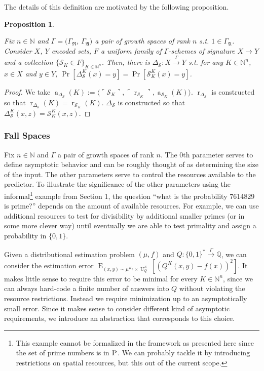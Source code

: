 \documentclass{article}
\numberwithin{equation}{section}
\theoremstyle{definition}
\theoremstyle{plain}
\newtheorem{proposition}{Proposition}[section]
\newcommand{\Bool}{\{0,1\}}
\newcommand{\Words}{{\Bool^*}}
\DeclareMathOperator{\E}{E}
\DeclareMathOperator{\R}{r}
\DeclareMathOperator{\A}{a}
\DeclareMathOperator{\Un}{U}
\newcommand{\Nats}{\mathbb{N}}
\newcommand{\Rats}{\mathbb{Q}}
\newcommand{\Chev}[1]{\langle #1 \rangle}
\newcommand{\Quote}[1]{\ulcorner #1 \urcorner}
\newcommand{\GrowR}{\Gamma_{\mathfrak{R}}}
\newcommand{\GrowA}{\Gamma_{\mathfrak{A}}}
\newcommand{\Scheme}{\xrightarrow{\Gamma}}
\begin{document}
The details of this definition are motivated by the following proposition.

\begin{proposition}
\label{prp:fam_diag}

Fix $n \in \Nats$ and $\Gamma=(\GrowR$, $\GrowA)$ a pair of growth spaces of rank $n$ s.t. $1 \in \GrowA$. Consider $X$, $Y$ encoded sets, $F$ a uniform family of $\Gamma$-schemes of signature $X \rightarrow Y$ and a collection ${\{\mathcal{S}_K \in F\}_{K \in \Nats^n}}$. Then, there is $\Delta_\mathcal{S}: X \xrightarrow{
\Gamma} Y$ s.t. for any $K \in \Nats^n$, $x \in X$ and $y \in Y$, ${\Pr[\Delta_\mathcal{S}^K(x)=y] = \Pr[\mathcal{S}_K^K(x)=y]}$.

\end{proposition}

\begin{proof}

We take $\A_{\Delta_{\mathcal{S}}}(K):=\Chev{\Quote{\mathcal{S}_K},\Quote{\R_{\mathcal{S}_K}},\A_{\mathcal{S}_K}(K)}$. $\R_{\Delta_{\mathcal{S}}}$ is constructed so that ${\R_{\Delta_{\mathcal{S}}}(K)=\R_{\mathcal{S}_K}(K)}$. $\Delta_{\mathcal{S}}$ is constructed so that $\Delta_{\mathcal{S}}^K(x,z)=\mathcal{S}_K^K(x,z)$.
\end{proof}

\subsubsection{Fall Spaces}

Fix $n \in \Nats$ and $\Gamma$ a pair of growth spaces of rank $n$. The 0th parameter serves to define asymptotic behavior and can be roughly thought of as determining the size of the input. The other parameters serve to control the resources available to the predictor. To illustrate the significance of the other parameters using the informal\footnote{This example cannot be formalized in the framework as presented here since the set of prime numbers is in $\textsc{P}$. We can probably tackle it by introducing restrictions on spatial resources, but this out of the current scope.} example from Section 1, the question \enquote{what is the probability 7614829 is prime?} depends on the amount of available resources. For example, we can use additional resources to test for divisibility by additional smaller primes (or in some more clever way) until eventually we are able to test primality and assign a probability in $\{0,1\}$.

Given a distributional estimation problem $(\mu,f)$ and $Q: \Words \Scheme \Rats$, we can consider the estimation error $\E_{(x,y) \sim \mu^{K_0} \times \Un_Q^K}[(Q^K(x,y) - f(x))^2]$. It makes little sense to require this error to be minimal for every $K \in \Nats^n$, since we can always hard-code a finite number of answers into $Q$ without violating the resource restrictions. Instead we require minimization up to an asymptotically small error. Since it makes sense to consider different kind of asymptotic requirements, we introduce an abstraction that corresponds to this choice.
\end{document}
